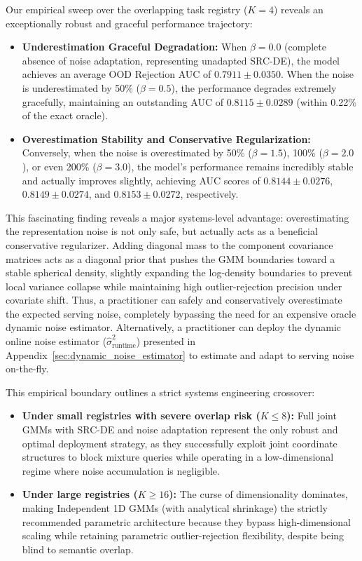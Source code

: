 Our empirical sweep over the overlapping task registry ($K=4$) reveals an exceptionally robust and graceful performance trajectory:
\begin{itemize}
    \item {\bf Underestimation Graceful Degradation:} When $\beta = 0.0$ (complete absence of noise adaptation, representing unadapted SRC-DE), the model achieves an average OOD Rejection AUC of $0.7911 \pm 0.0350$. When the noise is underestimated by 50\% ($\beta = 0.5$), the performance degrades extremely gracefully, maintaining an outstanding AUC of $0.8115 \pm 0.0289$ (within 0.22\% of the exact oracle).
    \item {\bf Overestimation Stability and Conservative Regularization:} Conversely, when the noise is overestimated by 50\% ($\beta = 1.5$), 100\% ($\beta = 2.0$), or even 200\% ($\beta = 3.0$), the model's performance remains incredibly stable and actually improves slightly, achieving AUC scores of $0.8144 \pm 0.0276$, $0.8149 \pm 0.0274$, and $0.8153 \pm 0.0272$, respectively. 
\end{itemize}
This fascinating finding reveals a major systems-level advantage: overestimating the representation noise is not only safe, but actually acts as a beneficial conservative regularizer. Adding diagonal mass to the component covariance matrices acts as a diagonal prior that pushes the GMM boundaries toward a stable spherical density, slightly expanding the log-density boundaries to prevent local variance collapse while maintaining high outlier-rejection precision under covariate shift. Thus, a practitioner can safely and conservatively overestimate the expected serving noise, completely bypassing the need for an expensive oracle dynamic noise estimator. Alternatively, a practitioner can deploy the dynamic online noise estimator ($\hat{\sigma}^2_{\text{runtime}}$) presented in Appendix~\ref{sec:dynamic_noise_estimator} to estimate and adapt to serving noise on-the-fly.

This empirical boundary outlines a strict systems engineering crossover:
\begin{itemize}
    \item {\bf Under small registries with severe overlap risk ($K \le 8$):} Full joint GMMs with SRC-DE and noise adaptation represent the only robust and optimal deployment strategy, as they successfully exploit joint coordinate structures to block mixture queries while operating in a low-dimensional regime where noise accumulation is negligible.
    \item {\bf Under large registries ($K \ge 16$):} The curse of dimensionality dominates, making Independent 1D GMMs (with analytical shrinkage) the strictly recommended parametric architecture because they bypass high-dimensional scaling while retaining parametric outlier-rejection flexibility, despite being blind to semantic overlap.
\end{itemize}

